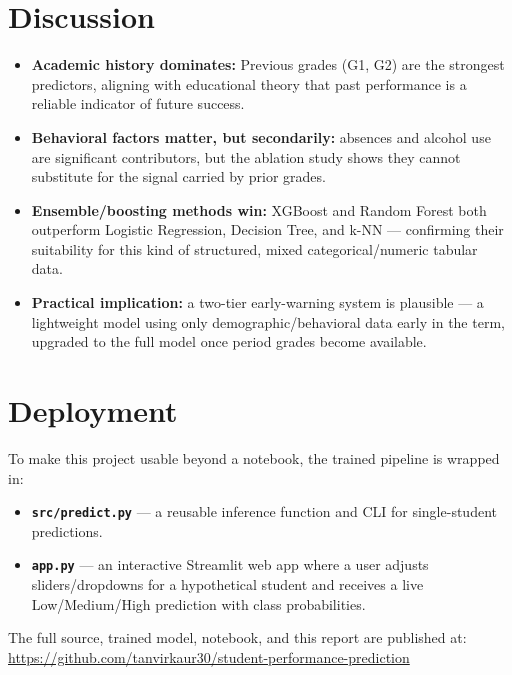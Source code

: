 \documentclass[12pt, a4paper]{article}
\begin{document}
\section{Discussion}
\label{sec:discussion}
\begin{itemize}[noitemsep]
    \item \textbf{Academic history dominates:} Previous grades (G1, G2) are the strongest
    predictors, aligning with educational theory that past performance is a reliable indicator
    of future success.
    \item \textbf{Behavioral factors matter, but secondarily:} absences and alcohol use are
    significant contributors, but the ablation study shows they cannot substitute for the
    signal carried by prior grades.
    \item \textbf{Ensemble/boosting methods win:} XGBoost and Random Forest both outperform
    Logistic Regression, Decision Tree, and k-NN — confirming their suitability for this kind
    of structured, mixed categorical/numeric tabular data.
    \item \textbf{Practical implication:} a two-tier early-warning system is plausible — a
    lightweight model using only demographic/behavioral data early in the term, upgraded to
    the full model once period grades become available.
\end{itemize}

\section{Deployment}
To make this project usable beyond a notebook, the trained pipeline is wrapped in:
\begin{itemize}[noitemsep]
    \item \textbf{\texttt{src/predict.py}} — a reusable inference function and CLI for single-student predictions.
    \item \textbf{\texttt{app.py}} — an interactive Streamlit web app where a user adjusts sliders/dropdowns for a hypothetical student and receives a live Low/Medium/High prediction with class probabilities.
\end{itemize}
The full source, trained model, notebook, and this report are published at:
\url{https://github.com/tanvirkaur30/student-performance-prediction}
\end{document}

